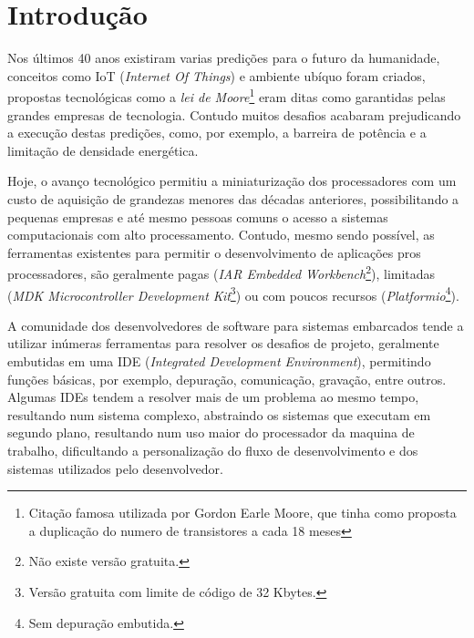\chapter{Introdução}
Nos últimos 40 anos existiram varias predições para o futuro da humanidade, conceitos como IoT (\textit{Internet Of Things})\cite{gates1995estrada} e ambiente ubíquo\cite{weiser1991computer} foram criados, propostas tecnológicas como a \textit{lei de Moore}\footnote{Citação famosa utilizada por Gordon Earle Moore, que tinha como proposta a duplicação do numero de transistores a cada 18 meses} eram ditas como garantidas pelas grandes empresas de tecnologia. Contudo muitos desafios acabaram prejudicando a execução destas predições, como, por exemplo, a barreira de potência\cite{Patterson:2008:COD:1502247} e a limitação de densidade energética\cite{paradiso2005energy}.

Hoje, o avanço tecnológico permitiu a miniaturização dos processadores com um custo de aquisição de grandezas menores das décadas anteriores\cite{nordhaus2007two}, possibilitando a pequenas empresas e até mesmo pessoas comuns o acesso a sistemas computacionais com alto processamento. Contudo, mesmo	 sendo possível, as ferramentas existentes para permitir o desenvolvimento de aplicações pros processadores, são geralmente pagas (\textit{IAR Embedded Workbench}\footnote{Não existe versão gratuita\cite{buyiar}.}), limitadas (\textit{MDK Microcontroller Development Kit}\footnote{Versão gratuita com limite de código de 32 Kbytes.}) ou com poucos recursos (\textit{Platformio}\footnote{Sem depuração embutida.}).

A comunidade dos desenvolvedores de software para sistemas embarcados tende a utilizar inúmeras ferramentas para resolver os desafios de projeto, geralmente embutidas em uma IDE (\textit{Integrated Development Environment}), permitindo funções básicas, por exemplo, depuração, comunicação, gravação, entre outros. Algumas IDEs tendem a resolver mais de um problema ao mesmo tempo, resultando num sistema complexo, abstraindo os sistemas que executam em segundo plano, resultando num uso maior do processador da maquina de trabalho, dificultando a personalização do fluxo de desenvolvimento e dos sistemas utilizados pelo desenvolvedor.

\iffalse
O intuito deste trabalho é a realização de um sistema para possibilitar aos desenvolvedores a programação de sistemas embarcados, sem a necessidade de utilizar sistemas assistencialistas que possam limitar a evolução do trabalho ou a utilização do produto final concebido.
\fi

